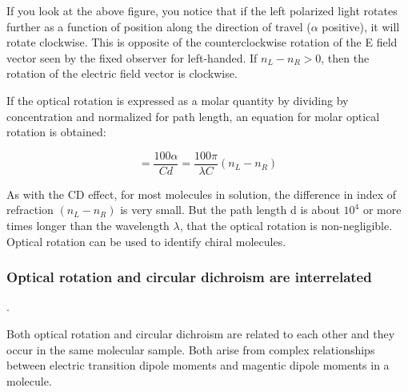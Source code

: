 \documentclass[12pt, letterpaper]{article}
\begin{document}
If you look at the above figure, you notice that if the left polarized light rotates further as a function of position along the direction of travel ($\alpha$ positive), it will rotate clockwise. This is 
opposite of the counterclockwise rotation of the E field vector seen by the fixed observer for left-handed. If \( n_L - n_R > 0 \), then the rotation of the electric field vector is clockwise.

If the optical rotation is expressed as a molar quantity by dividing by concentration and normalized for path length, an equation for molar optical rotation is obtained:

\begin{equation*}
    [\alpha] = \frac{100 \alpha}{Cd} = \frac{100 \pi}{\lambda C}(n_L - n_R)
\end{equation*}

As with the CD effect, for most molecules in solution, the difference in index of refraction \( (n_L - n_R) \) is very small. But the path length d is about $10^4$ or more times longer than 
the wavelength $\lambda$, that the optical rotation is non-negligible. Optical rotation can be used to identify chiral molecules.

\subsubsection*{Optical rotation and circular dichroism are interrelated}. 

Both optical rotation and circular dichroism are related to each other and they occur in the same molecular sample. Both arise from complex relationships between electric transition dipole moments and magentic dipole moments in a molecule. 
\end{document}
